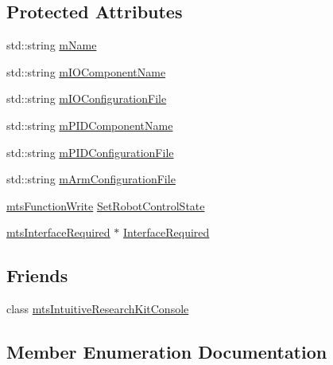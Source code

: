 \subsection*{Protected Attributes}
\begin{DoxyCompactItemize}
\item 
std\+::string \hyperlink{classmts_intuitive_research_kit_console_1_1_arm_a5693697a8b14ebd601b1d1ff18b22d94}{m\+Name}
\item 
std\+::string \hyperlink{classmts_intuitive_research_kit_console_1_1_arm_ac5010e0fdd71d2f87c123ef1931e3f62}{m\+I\+O\+Component\+Name}
\item 
std\+::string \hyperlink{classmts_intuitive_research_kit_console_1_1_arm_a14ea7da9b455d326f2458f4b27d062d0}{m\+I\+O\+Configuration\+File}
\item 
std\+::string \hyperlink{classmts_intuitive_research_kit_console_1_1_arm_a03dbe96c5a71a8ce46bb37177bf22351}{m\+P\+I\+D\+Component\+Name}
\item 
std\+::string \hyperlink{classmts_intuitive_research_kit_console_1_1_arm_a380c1811ecda360d324a14a3de57b4b8}{m\+P\+I\+D\+Configuration\+File}
\item 
std\+::string \hyperlink{classmts_intuitive_research_kit_console_1_1_arm_aa0d61e31bc02be631a22f052df1d7c69}{m\+Arm\+Configuration\+File}
\item 
\hyperlink{classmts_function_write}{mts\+Function\+Write} \hyperlink{classmts_intuitive_research_kit_console_1_1_arm_a84684b49b9b5a5773a6761d08086c9bf}{Set\+Robot\+Control\+State}
\item 
\hyperlink{classmts_interface_required}{mts\+Interface\+Required} $\ast$ \hyperlink{classmts_intuitive_research_kit_console_1_1_arm_a19bf350b32efd2c9fd612676f3772c5a}{Interface\+Required}
\end{DoxyCompactItemize}
\subsection*{Friends}
\begin{DoxyCompactItemize}
\item 
class \hyperlink{classmts_intuitive_research_kit_console_1_1_arm_a6e35490bedd0064dfeec97d358594b90}{mts\+Intuitive\+Research\+Kit\+Console}
\end{DoxyCompactItemize}


\subsection{Member Enumeration Documentation}
\hypertarget{classmts_intuitive_research_kit_console_1_1_arm_acb898ba65d323f59ffd0885a47ef6cec}{}
